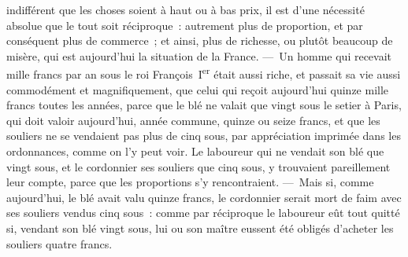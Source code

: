 \documentclass[french,twoside]{book} %
\begin{document}
indifférent que les choses soient à haut ou à bas prix, il est d’une nécessité absolue que le tout soit réciproque : autrement plus de proportion, et par conséquent plus de commerce ; et ainsi, plus de richesse, ou plutôt beaucoup de misère, qui est aujourd’hui la situation de la France. — Un homme qui recevait mille francs par an sous le roi François I\textsuperscript{er} était aussi riche, et passait sa vie aussi commodément et magnifiquement, que celui qui reçoit aujourd’hui quinze mille francs toutes les années, parce que le blé ne valait que vingt sous le setier à Paris, qui doit valoir aujourd’hui, année commune, quinze ou seize francs, et que les souliers ne se vendaient pas plus de cinq sous, par appréciation imprimée dans les ordonnances, comme on l’y peut voir. Le laboureur qui ne vendait son blé que vingt sous, et le cordonnier ses souliers que cinq sous, y trouvaient pareillement leur compte, parce que les proportions s’y rencontraient. — Mais si, comme aujourd’hui, le blé avait valu quinze francs, le cordonnier serait mort de faim avec ses souliers vendus cinq sous : comme par réciproque le laboureur eût tout quitté si, vendant son blé vingt sous, lui ou son maître eussent été obligés d’acheter les souliers quatre francs.\par
\end{document}
